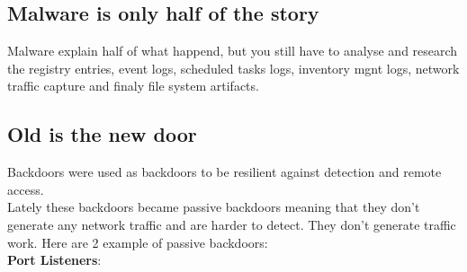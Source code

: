 \documentclass[10pt,a4paper]{article}
\begin{document}
\subsection{Malware is only half of the story}
Malware explain half of what happend, but you still have to analyse and research the registry entries, event logs, scheduled tasks logs, inventory mgnt logs, network traffic capture and finaly file system artifacts.
\subsection{Old is the new door}
Backdoors were used as backdoors to be resilient against detection and remote access.\\ Lately these backdoors became passive backdoors meaning that they don't generate any network traffic and are harder to detect. They don't generate traffic work. Here are 2 example of passive backdoors:\\
\textbf{Port Listeners}: 
\end{document}
